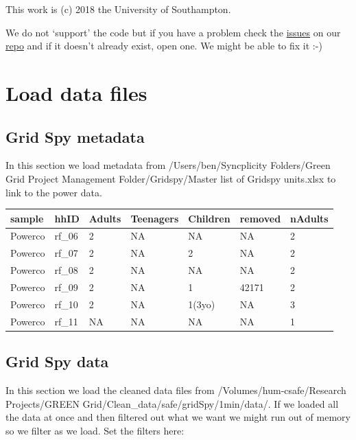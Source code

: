 \documentclass[]{article}
\newenvironment{Shaded}{\begin{snugshade}}{\end{snugshade}}
\newcommand{\KeywordTok}[1]{\textcolor[rgb]{0.13,0.29,0.53}{\textbf{#1}}}
\newcommand{\CharTok}[1]{\textcolor[rgb]{0.31,0.60,0.02}{#1}}
\newcommand{\StringTok}[1]{\textcolor[rgb]{0.31,0.60,0.02}{#1}}
\newcommand{\OperatorTok}[1]{\textcolor[rgb]{0.81,0.36,0.00}{\textbf{#1}}}
\newcommand{\NormalTok}[1]{#1}
\begin{document}
This work is (c) 2018 the University of Southampton.

We do not `support' the code but if you have a problem check the
\href{https://git.soton.ac.uk/ba1e12/nzGREENGrid/issues}{issues} on our
\href{https://git.soton.ac.uk/ba1e12/nzGREENGrid}{repo} and if it
doesn't already exist, open one. We might be able to fix it :-)

\section{Load data files}\label{load-data-files}

\subsection{Grid Spy metadata}\label{grid-spy-metadata}

In this section we load metadata from /Users/ben/Syncplicity
Folders/Green Grid Project Management Folder/Gridspy/Master list of
Gridspy units.xlsx to link to the power data.

\begin{longtable}[]{@{}lllllll@{}}
\toprule
sample & hhID & Adults & Teenagers & Children & removed &
nAdults\tabularnewline
\midrule
\endhead
Powerco & rf\_06 & 2 & NA & NA & NA & 2\tabularnewline
Powerco & rf\_07 & 2 & NA & 2 & NA & 2\tabularnewline
Powerco & rf\_08 & 2 & NA & NA & NA & 2\tabularnewline
Powerco & rf\_09 & 2 & NA & 1 & 42171 & 2\tabularnewline
Powerco & rf\_10 & 2 & NA & 1(3yo) & NA & 3\tabularnewline
Powerco & rf\_11 & NA & NA & NA & NA & 1\tabularnewline
\bottomrule
\end{longtable}

\subsection{Grid Spy data}\label{grid-spy-data}

In this section we load the cleaned data files from
/Volumes/hum-csafe/Research Projects/GREEN
Grid/Clean\_data/safe/gridSpy/1min/data/. If we loaded all the data at
once and then filtered out what we want we might run out of memory so we
filter as we load. Set the filters here:

\begin{Shaded}
\end{Shaded}
\end{document}
